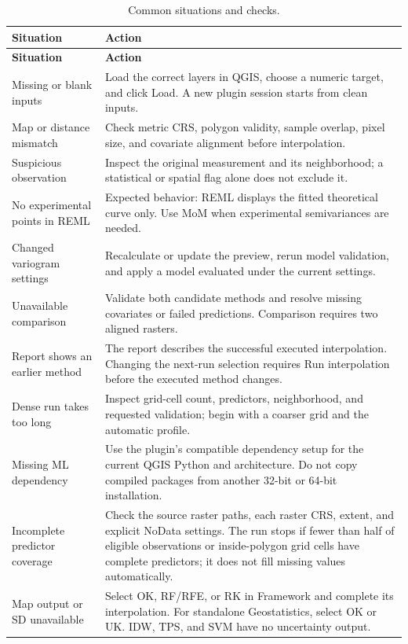\documentclass[11pt,a4paper]{article}
\begin{document}
\begin{longtable}{P{0.30\textwidth}P{0.62\textwidth}}
\caption{Common situations and checks.}\label{tab:troubleshooting}\\
\toprule
\textbf{Situation} & \textbf{Action} \\
\midrule
\endfirsthead
\toprule
\textbf{Situation} & \textbf{Action} \\
\midrule
\endhead
Missing or blank inputs & Load the correct layers in QGIS, choose a numeric target, and click Load. A new plugin session starts from clean inputs. \\
Map or distance mismatch & Check metric CRS, polygon validity, sample overlap, pixel size, and covariate alignment before interpolation. \\
Suspicious observation & Inspect the original measurement and its neighborhood; a statistical or spatial flag alone does not exclude it. \\
No experimental points in REML & Expected behavior: REML displays the fitted theoretical curve only. Use MoM when experimental semivariances are needed. \\
Changed variogram settings & Recalculate or update the preview, rerun model validation, and apply a model evaluated under the current settings. \\
Unavailable comparison & Validate both candidate methods and resolve missing covariates or failed predictions. Comparison requires two aligned rasters. \\
Report shows an earlier method & The report describes the successful executed interpolation. Changing the next-run selection requires Run interpolation before the executed method changes. \\
Dense run takes too long & Inspect grid-cell count, predictors, neighborhood, and requested validation; begin with a coarser grid and the automatic profile. \\
Missing ML dependency & Use the plugin's compatible dependency setup for the current QGIS Python and architecture. Do not copy compiled packages from another 32-bit or 64-bit installation. \\
Incomplete predictor coverage & Check the source raster paths, each raster CRS, extent, and explicit NoData settings. The run stops if fewer than half of eligible observations or inside-polygon grid cells have complete predictors; it does not fill missing values automatically. \\
Map output or SD unavailable & Select OK, RF/RFE, or RK in Framework and complete its interpolation. For standalone Geostatistics, select OK or UK. IDW, TPS, and SVM have no uncertainty output. \\

\end{longtable}
\end{document}
